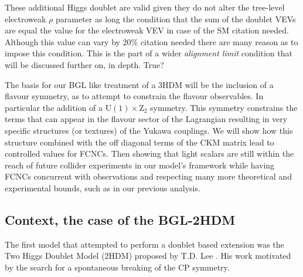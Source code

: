 These additional Higgs doublet are valid given they do not alter the tree-level electroweak $\rho$ parameter as long the condition that the sum of the doublet VEVs are equal the value for the electroweak VEV in case of the SM {\color{blue} citation needed}. 
% 
Although this value can vary by 20\% { \color{blue} citation needed} there are many reason as to impose this condition.
%
This is the part of a wider \textit{alignment limit} condition that will be discussed further on, in depth. { \color{blue} True? } 

The basis for our BGL like treatment of a 3HDM will be the inclusion of a flavour symmetry, as to attempt to constrain the flavour observables. In particular the addition of a $\mathrm{U}(1) \times \mathrm{Z}_2$ symmetry.
% 
This symmetry constrains the terms that can appear in the flavour sector of the Lagrangian resulting in very specific structures (or textures) of the Yukawa couplings.
% 
We will show how this structure combined with the off diagonal terms of the CKM matrix lead to controlled values for FCNCs. 
%
%
Then showing that light scalars are still within the reach of future collider experiments in our model's framework while having FCNCs concurrent with observations and respecting many more theoretical and experimental bounds, such as in our previous analysis. 


\subsection{Context, the case of the BGL-2HDM}

The first model that attempted to perform a doublet based extension was the Two Higgs Doublet Model (2HDM) proposed by T.D. Lee \cite{Lee1973}.  
%
His work motivated by the search for a spontaneous breaking of the CP symmetry. 

